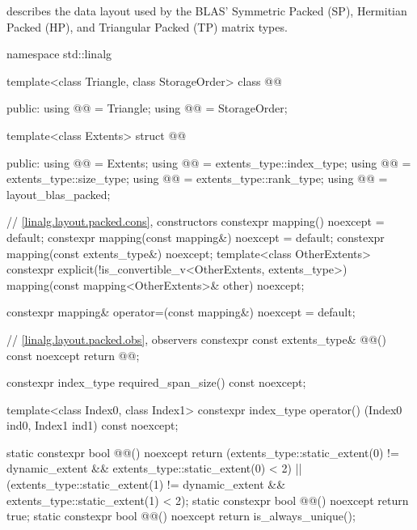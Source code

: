 \pnum
\begin{note}
 describes the data layout used by
the BLAS'
Symmetric Packed (SP), Hermitian Packed (HP), and Triangular Packed (TP)
matrix types.
\end{note}
\begin{codeblock}
namespace std::linalg {
  template<class Triangle, class StorageOrder>
  class @@ {
  public:
    using @@ = Triangle;
    using @@ = StorageOrder;

    template<class Extents>
    struct @@ {
    public:
      using @@ = Extents;
      using @@ = extents_type::index_type;
      using @@ = extents_type::size_type;
      using @@ = extents_type::rank_type;
      using @@ = layout_blas_packed;

      // \ref{linalg.layout.packed.cons}, constructors
      constexpr mapping() noexcept = default;
      constexpr mapping(const mapping&) noexcept = default;
      constexpr mapping(const extents_type&) noexcept;
      template<class OtherExtents>
        constexpr explicit(!is_convertible_v<OtherExtents, extents_type>)
          mapping(const mapping<OtherExtents>& other) noexcept;

      constexpr mapping& operator=(const mapping&) noexcept = default;

      // \ref{linalg.layout.packed.obs}, observers
      constexpr const extents_type& @@() const noexcept { return @@; }

      constexpr index_type required_span_size() const noexcept;

      template<class Index0, class Index1>
        constexpr index_type operator() (Index0 ind0, Index1 ind1) const noexcept;

      static constexpr bool @@() noexcept {
        return (extents_type::static_extent(0) != dynamic_extent &&
                extents_type::static_extent(0) < 2) ||
               (extents_type::static_extent(1) != dynamic_extent &&
                extents_type::static_extent(1) < 2);
      }
      static constexpr bool @@() noexcept { return true; }
      static constexpr bool @@() noexcept
        { return is_always_unique(); }

}}}
\end{codeblock}
